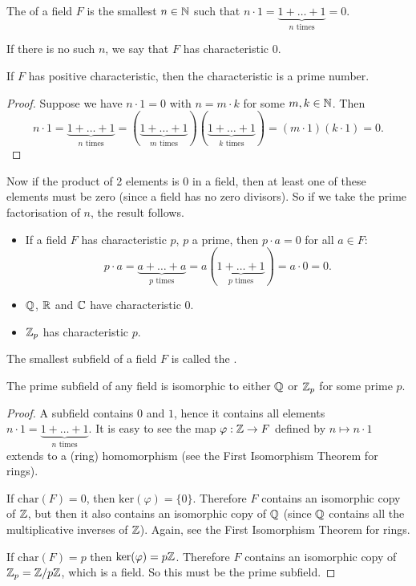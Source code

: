 \begin{definition}
	The  of a field $F$ is the  smallest $n \in \mathbb{N}$ such that $n \cdot 1 = \underbrace{1 + \ldots + 1}_{n \text{ times}} = 0$.
	
	If there is no such $n$, we say that $F$ has characteristic $0$.
\end{definition}

\begin{proposition}
	If $F$ has positive characteristic, then the characteristic is a prime number.
	\begin{proof}
		Suppose we have $n \cdot 1 = 0$ with $n = m \cdot k$ for some $m, k \in \mathbb{N}$. Then
		\[
			n \cdot 1 = \underbrace{1 + \ldots + 1}_{n \text{ times}} = (\underbrace{1 + \ldots + 1}_{m \text{ times}})(\underbrace{1 + \ldots + 1}_{k \text{ times}}) = (m \cdot 1)(k \cdot 1) = 0.
		\]
	\end{proof}
	Now if the product of 2 elements is $0$ in a field, then at least one of these elements must be zero (since a field has no zero divisors). So if we take the prime factorisation of $n$, the result follows.
\end{proposition}

\begin{remarks}\hfill
	\begin{itemize}
		\item If a field $F$ has characteristic $p$, $p$ a prime, then $p \cdot a = 0$ for all $a \in F$:
		\[
			p \cdot a = \underbrace{a + \ldots + a}_{p \text{ times}} = a(\underbrace{1 + \ldots + 1}_{p \text{ times}}) = a \cdot 0 = 0.
		\]
		\item $\mathbb{Q}$, $\mathbb{R}$ and $\mathbb{C}$ have characteristic $0$.
		\item $\mathbb{Z}_p$ has characteristic $p$.
	\end{itemize}
\end{remarks}

\begin{definition}
	The smallest subfield of a field $F$ is called the .
\end{definition}

\begin{proposition}
	The prime subfield of any field is isomorphic to either $\mathbb{Q}$ or $\mathbb{Z}_p$ for some prime $p$.
	\begin{proof}
		A subfield contains $0$ and $1$, hence it contains all elements $n \cdot 1 = \underbrace{1 + \ldots + 1}_{n \text{ times}}$. It is easy to see the map $\varphi : \mathbb{Z} \to F$ defined by $n \mapsto n \cdot 1$ extends to a (ring) homomorphism (see the First Isomorphism Theorem for rings).
		
		If $\text{char}(F) = 0$, then $\text{ker}(\varphi) = \{0\}$. Therefore $F$ contains an isomorphic copy of $\mathbb{Z}$, but then it also contains an isomorphic copy of $\mathbb{Q}$ (since $\mathbb{Q}$ contains all the multiplicative inverses of $\mathbb{Z}$). Again, see the First Isomorphism Theorem for rings.
		
		If $\text{char}(F) = p$ then $\text{ker}(\varphi) = p\mathbb{Z}$. Therefore $F$ contains an isomorphic copy of $\mathbb{Z}_p = \mathbb{Z} / p\mathbb{Z}$, which is  a field. So this must be the prime subfield.
	\end{proof}
\end{proposition}

